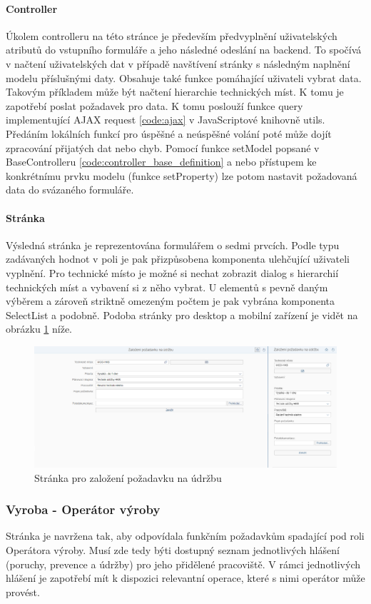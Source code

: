 \documentclass[thesis=M,czech]{FITthesis}[2012/06/26]
\begin{document}
\paragraph{Controller}
Úkolem controlleru na této stránce je především předvyplnění uživatelských atributů do vstupního formuláře a jeho následné odeslání na backend. To spočívá v načtení uživatelských dat v případě navštívení stránky s následným  naplnění modelu příslušnými daty. Obsahuje také funkce pomáhající uživateli vybrat data. Takovým příkladem může být načtení hierarchie technických míst. K tomu je zapotřebí poslat požadavek pro data. K tomu poslouží funkce query implementující AJAX request \ref{code:ajax} v JavaScriptové knihovně utils. Předáním lokálních funkcí pro úspěšné a neúspěšné volání poté může dojít zpracování přijatých dat nebo chyb. Pomocí funkce setModel popsané v BaseControlleru \ref{code:controller_base_definition} a nebo přístupem ke konkrétnímu prvku modelu (funkce setProperty) lze potom nastavit požadovaná data do svázaného formuláře. 
\paragraph{Stránka}
Výsledná stránka je reprezentována formulářem o sedmi prvcích. Podle typu zadávaných hodnot v poli je pak přizpůsobena komponenta ulehčující uživateli vyplnění. Pro technické místo je možné si nechat zobrazit dialog s hierarchií technických míst a vybavení si z něho vybrat. U elementů s pevně daným výběrem a zároveň striktně omezeným počtem je pak vybrána komponenta SelectList a podobně. Podoba stránky pro desktop a mobilní zařízení je vidět na obrázku \ref{img:view_zalozeni_pu} níže.
\begin{figure}[H]
	\centering
	\includegraphics[width=1\textwidth]{images/view_zalozeni_pu}
	\caption{Stránka pro založení požadavku na údržbu}
	\label{img:view_zalozeni_pu}
\end{figure}

\subsubsection{Vyroba - Operátor výroby}
\label{sssec:fiori_vyroba}
Stránka je navržena tak, aby odpovídala funkčním požadavkům spadající pod roli Operátora výroby. Musí zde tedy býti dostupný seznam jednotlivých hlášení (poruchy, prevence a údržby) pro jeho přidělené pracoviště. V rámci jednotlivých hlášení je zapotřebí mít k dispozici relevantní operace, které s nimi operátor může provést.
\end{document}
